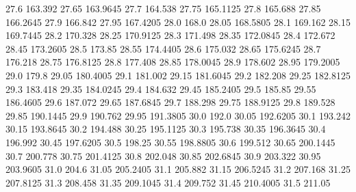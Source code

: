            27.6          163.392
          27.65         163.9645
           27.7          164.538
          27.75         165.1125
           27.8          165.688
          27.85         166.2645
           27.9          166.842
          27.95         167.4205
           28.0            168.0
          28.05         168.5805
           28.1          169.162
          28.15         169.7445
           28.2          170.328
          28.25         170.9125
           28.3          171.498
          28.35         172.0845
           28.4          172.672
          28.45         173.2605
           28.5           173.85
          28.55         174.4405
           28.6          175.032
          28.65         175.6245
           28.7          176.218
          28.75         176.8125
           28.8          177.408
          28.85         178.0045
           28.9          178.602
          28.95         179.2005
           29.0            179.8
          29.05         180.4005
           29.1          181.002
          29.15         181.6045
           29.2          182.208
          29.25         182.8125
           29.3          183.418
          29.35         184.0245
           29.4          184.632
          29.45         185.2405
           29.5           185.85
          29.55         186.4605
           29.6          187.072
          29.65         187.6845
           29.7          188.298
          29.75         188.9125
           29.8          189.528
          29.85         190.1445
           29.9          190.762
          29.95         191.3805
           30.0            192.0
          30.05         192.6205
           30.1          193.242
          30.15         193.8645
           30.2          194.488
          30.25         195.1125
           30.3          195.738
          30.35         196.3645
           30.4          196.992
          30.45         197.6205
           30.5           198.25
          30.55         198.8805
           30.6          199.512
          30.65         200.1445
           30.7          200.778
          30.75         201.4125
           30.8          202.048
          30.85         202.6845
           30.9          203.322
          30.95         203.9605
           31.0            204.6
          31.05         205.2405
           31.1          205.882
          31.15         206.5245
           31.2          207.168
          31.25         207.8125
           31.3          208.458
          31.35         209.1045
           31.4          209.752
          31.45         210.4005
           31.5           211.05
